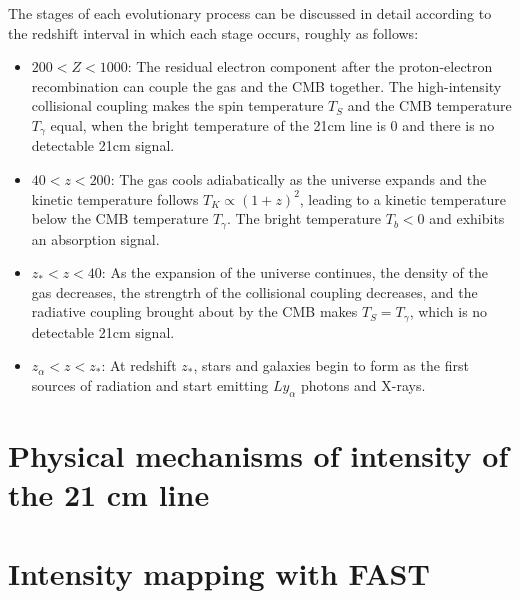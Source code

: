 \documentclass{article}
\begin{document}
The stages of each evolutionary process can be discussed in detail according to the redshift interval in which each stage occurs, roughly as follows:
\begin{itemize}
    \item $200<Z<1000$: The residual electron component after the proton-electron recombination can couple the gas and the CMB together. The high-intensity collisional coupling makes the spin temperature $T_{S}$ and the CMB temperature $T_{\gamma}$ equal, when the bright temperature of the 21cm line is 0 and there is no detectable 21cm signal.
    \item $40<z<200$: The gas cools adiabatically as the universe expands and the kinetic temperature follows $T_K\propto (1+z)^2$, leading to a kinetic temperature below the CMB temperature $T_{\gamma}$. The bright temperature $T_b < 0$ and exhibits an absorption signal. 
    \item $z_*<z<40$: As the expansion of the universe continues, the density of the gas decreases, the strengtrh of the collisional coupling decreases, and the radiative coupling brought about by the CMB makes $T_S=T_{\gamma}$, which is no detectable 21cm signal.
    \item $z_\alpha < z < z_*$: At redshift $z_*$, stars and galaxies begin to form as the first sources of radiation and start emitting $Ly_\alpha$ photons and X-rays. 
\end{itemize}

\section{Physical mechanisms of intensity of the 21 cm line}

\section{Intensity mapping with FAST}
\end{document}
